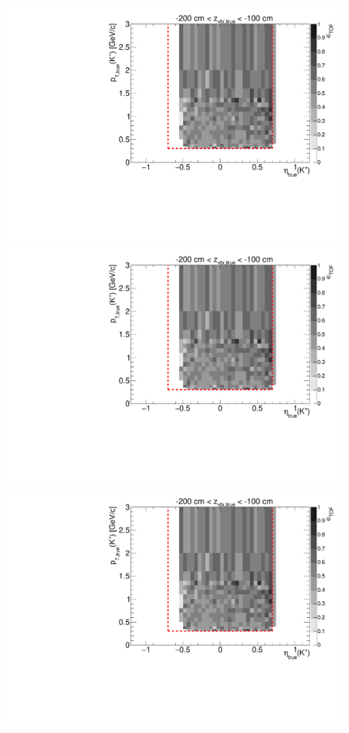 \begin{figure}[hb]\ContinuedFloat
\centering
\parbox{0.495\textwidth}{
  \centering
  \includegraphics[width=\linewidth,page=11]{graphics/eff/Eff2D_TOF_kaon_Plus.pdf}\\
  \includegraphics[width=\linewidth,page=13]{graphics/eff/Eff2D_TOF_kaon_Plus.pdf}\\
  \includegraphics[width=\linewidth,page=15]{graphics/eff/Eff2D_TOF_kaon_Plus.pdf}\\
}
\end{figure}
